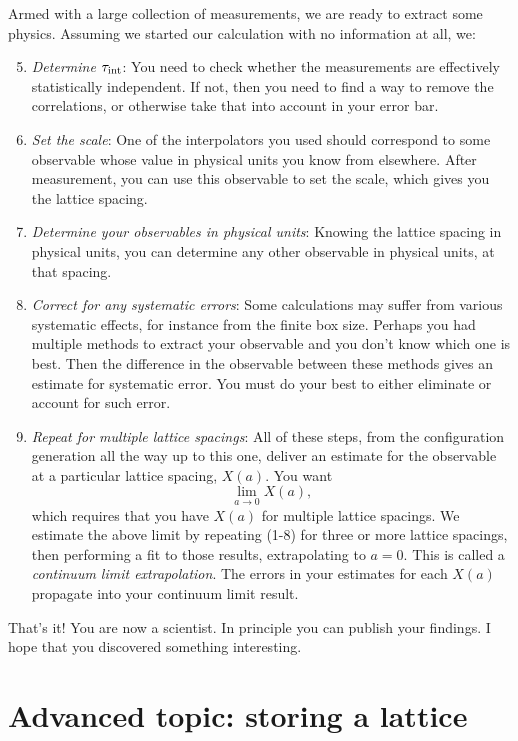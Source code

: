 Armed with a large collection of measurements, we are ready to extract some
physics. Assuming we started our calculation with no information at all, we:
\begin{enumerate}
\setcounter{enumi}{4}
  \item {\it Determine $\tau_\text{int}$}: You need to check whether the measurements 
are effectively statistically independent. If not, then you need to find a way
to remove the correlations, or otherwise take that into account in your error
bar.
  \item {\it Set the scale}: One of the interpolators you used should correspond
to some observable whose value in physical units you know from elsewhere. After
measurement, you can use this observable to set the scale, which gives you the
lattice spacing. 
  \item {\it Determine your observables in physical units}: Knowing the lattice
spacing in physical units, you can determine any other observable in physical
units, at that spacing.
  \item {\it Correct for any systematic errors}: Some calculations may suffer
from various systematic effects, for instance from the finite box size. Perhaps
you had multiple methods to extract your observable and you don't know which one
is best. Then the difference in the observable between these methods gives an
estimate for systematic error. You must do your best to either eliminate or
account for such error.
  \item {\it Repeat for multiple lattice spacings}: All of these steps, from the
configuration generation all the way up to this one, deliver an estimate for
the observable at a particular lattice spacing, $X(a)$. You want
$$\lim_{a\to0}X(a),$$
which requires that you have $X(a)$ for multiple lattice spacings. We estimate
the above limit by repeating (1-8) for three or more lattice
spacings, then performing a fit to those results, extrapolating to $a=0$.
This is called a {\it continuum limit extrapolation}. The errors in your
estimates for each $X(a)$ propagate into your continuum limit result.
\end{enumerate}
That's it! You are now a scientist. In principle you can publish your findings.
I hope that you discovered something interesting.

\section{Advanced topic: storing a lattice}

